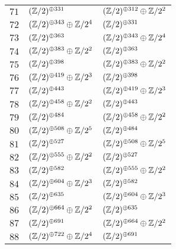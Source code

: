 \begin{supertabular}{|c|p{5.5cm}|p{5.5cm}|}
$71$%
&$(\mathbb{Z}/2)^{\oplus331}$%
&$(\mathbb{Z}/2)^{\oplus312}\oplus\mathbb{Z}/2^{2}$\\

$72$%
&$(\mathbb{Z}/2)^{\oplus343}\oplus\mathbb{Z}/2^{4}$%
&$(\mathbb{Z}/2)^{\oplus331}$\\

$73$%
&$(\mathbb{Z}/2)^{\oplus363}$%
&$(\mathbb{Z}/2)^{\oplus343}\oplus\mathbb{Z}/2^{4}$\\

$74$%
&$(\mathbb{Z}/2)^{\oplus383}\oplus\mathbb{Z}/2^{2}$%
&$(\mathbb{Z}/2)^{\oplus363}$\\

$75$%
&$(\mathbb{Z}/2)^{\oplus398}$%
&$(\mathbb{Z}/2)^{\oplus383}\oplus\mathbb{Z}/2^{2}$\\

$76$%
&$(\mathbb{Z}/2)^{\oplus419}\oplus\mathbb{Z}/2^{3}$%
&$(\mathbb{Z}/2)^{\oplus398}$\\

$77$%
&$(\mathbb{Z}/2)^{\oplus443}$%
&$(\mathbb{Z}/2)^{\oplus419}\oplus\mathbb{Z}/2^{3}$\\

$78$%
&$(\mathbb{Z}/2)^{\oplus458}\oplus\mathbb{Z}/2^{2}$%
&$(\mathbb{Z}/2)^{\oplus443}$\\

$79$%
&$(\mathbb{Z}/2)^{\oplus484}$%
&$(\mathbb{Z}/2)^{\oplus458}\oplus\mathbb{Z}/2^{2}$\\

$80$%
&$(\mathbb{Z}/2)^{\oplus508}\oplus\mathbb{Z}/2^{5}$%
&$(\mathbb{Z}/2)^{\oplus484}$\\

$81$%
&$(\mathbb{Z}/2)^{\oplus527}$%
&$(\mathbb{Z}/2)^{\oplus508}\oplus\mathbb{Z}/2^{5}$\\

$82$%
&$(\mathbb{Z}/2)^{\oplus555}\oplus\mathbb{Z}/2^{2}$%
&$(\mathbb{Z}/2)^{\oplus527}$\\

$83$%
&$(\mathbb{Z}/2)^{\oplus582}$%
&$(\mathbb{Z}/2)^{\oplus555}\oplus\mathbb{Z}/2^{2}$\\

$84$%
&$(\mathbb{Z}/2)^{\oplus604}\oplus\mathbb{Z}/2^{3}$%
&$(\mathbb{Z}/2)^{\oplus582}$\\

$85$%
&$(\mathbb{Z}/2)^{\oplus635}$%
&$(\mathbb{Z}/2)^{\oplus604}\oplus\mathbb{Z}/2^{3}$\\

$86$%
&$(\mathbb{Z}/2)^{\oplus664}\oplus\mathbb{Z}/2^{2}$%
&$(\mathbb{Z}/2)^{\oplus635}$\\

$87$%
&$(\mathbb{Z}/2)^{\oplus691}$%
&$(\mathbb{Z}/2)^{\oplus664}\oplus\mathbb{Z}/2^{2}$\\

$88$%
&$(\mathbb{Z}/2)^{\oplus722}\oplus\mathbb{Z}/2^{4}$%
&$(\mathbb{Z}/2)^{\oplus691}$\\


\end{supertabular}

